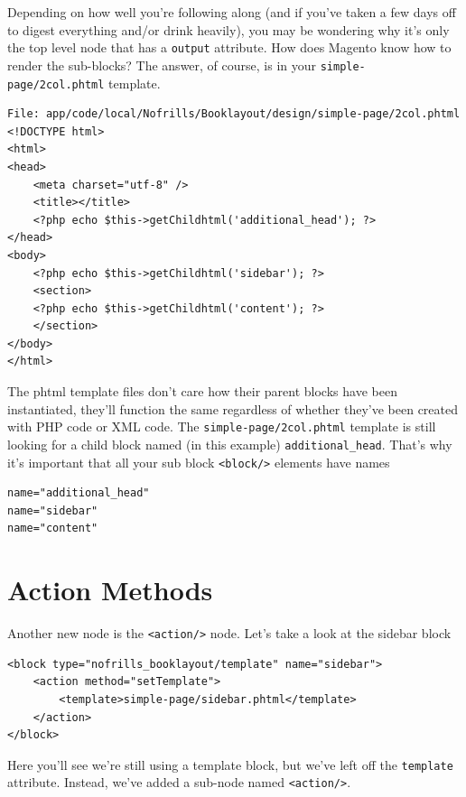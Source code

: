 \documentclass[oneside]{book}
\begin{document}
Depending on how well you're following along (and if you've taken a few days off to digest everything and/or drink heavily), you may be wondering why it's only the top level node that has a \footnotesize\texttt{output} \normalsize  attribute.  How does Magento know how to render the sub-blocks?  The answer, of course, is in your \footnotesize\texttt{simple-page/2col.phtml} \normalsize  template.

\begin{lstlisting}
File: app/code/local/Nofrills/Booklayout/design/simple-page/2col.phtml
<!DOCTYPE html>
<html>
<head>
    <meta charset="utf-8" />
    <title></title>
    <?php echo $this->getChildhtml('additional_head'); ?>
</head>
<body>
    <?php echo $this->getChildhtml('sidebar'); ?>
    <section>
    <?php echo $this->getChildhtml('content'); ?>
    </section>
</body>
</html>

\end{lstlisting}


The phtml template files don't care how their parent blocks have been instantiated, they'll function the same regardless of whether they've been created with PHP code or XML code.  The \footnotesize\texttt{simple-page/2col.phtml} \normalsize  template is still looking for a child block named (in this example) \footnotesize\texttt{additional\_head}\normalsize.  That's why it's important that all your sub block  \footnotesize\texttt{\textless block/\textgreater } \normalsize  elements have names

\begin{lstlisting}
name="additional_head"
name="sidebar"
name="content"

\end{lstlisting}


\section{Action Methods}

Another new node is the \footnotesize\texttt{\textless action/\textgreater } \normalsize  node.  Let's take a look at the sidebar block

\begin{lstlisting}
<block type="nofrills_booklayout/template" name="sidebar">
    <action method="setTemplate">
        <template>simple-page/sidebar.phtml</template>
    </action>
</block>

\end{lstlisting}


Here you'll see we're still using a template block, but we've left off the \footnotesize\texttt{template} \normalsize  attribute.  Instead, we've added a sub-node named \footnotesize\texttt{\textless action/\textgreater }\normalsize.
\end{document}
